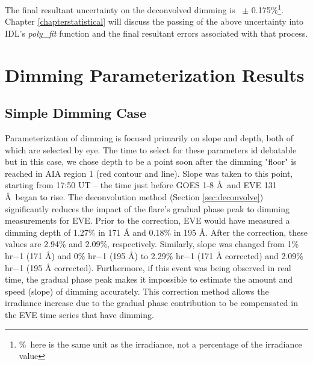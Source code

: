 The final resultant uncertainty on the deconvolved dimming is ~$\pm$ 0.175\%\footnote{\%\ here is the same unit as the irradiance, not a percentage of the irradiance value}. Chapter \ref{chapterstatistical} will discuss the passing of the above uncertainty into IDL's \textit{poly{\_}fit} function and the final resultant errors associated with that process. 

\section{Dimming Parameterization Results}
\label{sec:casestudyresults}

\subsection{Simple Dimming Case}
Parameterization of dimming is focused primarily on slope and depth, both of which are selected by eye. The time to select for these parameters id debatable but in this case, we chose depth to be a point soon after the dimming "floor" is reached in AIA region 1 (red contour and line). Slope was taken to this point, starting from 17:50 UT -- the time just before GOES 1-8 \AA\ and EVE 131 \AA\ began to rise. The deconvolution method (Section \ref{sec:deconvolve}) significantly reduces the impact of the flare’s gradual phase peak to dimming measurements for EVE. Prior to the correction, EVE would have measured a dimming depth of 1.27\% in 171 Å and 0.18\% in 195 Å. After the correction, these values are 2.94\% and 2.09\%, respectively. Similarly, slope was changed from 1\% hr−1 (171 Å) and 0\% hr−1 (195 Å) to 2.29\% hr−1 (171 Å corrected) and 2.09\% hr−1 (195 Å corrected). Furthermore, if this event was being observed in real time, the gradual phase peak makes it impossible to estimate the amount and speed (slope) of dimming accurately. This correction method allows the irradiance increase due to the gradual phase contribution to be compensated in the EVE time series that have dimming.

